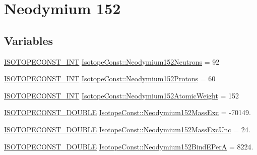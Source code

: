 \hypertarget{group___isotope_const-_neodymium-_nd152}{}\section{Neodymium 152}
\label{group___isotope_const-_neodymium-_nd152}
\subsection*{Variables}
\begin{DoxyCompactItemize}
\item 
\mbox{\hyperlink{group___isotope_const-_macros_ga5f18360b3e99483a35c32d789e62621c}{I\+S\+O\+T\+O\+P\+E\+C\+O\+N\+S\+T\+\_\+\+I\+NT}} \mbox{\hyperlink{group___isotope_const-_neodymium-_nd152_ga5b9b229177b8845abaec4a70f13971ec}{Isotope\+Const\+::\+Neodymium152\+Neutrons}} = 92
\item 
\mbox{\hyperlink{group___isotope_const-_macros_ga5f18360b3e99483a35c32d789e62621c}{I\+S\+O\+T\+O\+P\+E\+C\+O\+N\+S\+T\+\_\+\+I\+NT}} \mbox{\hyperlink{group___isotope_const-_neodymium-_nd152_ga3c7a49ac0a067dd34a0bd091e7fdbc4e}{Isotope\+Const\+::\+Neodymium152\+Protons}} = 60
\item 
\mbox{\hyperlink{group___isotope_const-_macros_ga5f18360b3e99483a35c32d789e62621c}{I\+S\+O\+T\+O\+P\+E\+C\+O\+N\+S\+T\+\_\+\+I\+NT}} \mbox{\hyperlink{group___isotope_const-_neodymium-_nd152_ga7ed50e1ec9d535867cab3b4f333e3b79}{Isotope\+Const\+::\+Neodymium152\+Atomic\+Weight}} = 152
\item 
\mbox{\hyperlink{group___isotope_const-_macros_ga8f45a7272ce02c0b4c65c44636ed719a}{I\+S\+O\+T\+O\+P\+E\+C\+O\+N\+S\+T\+\_\+\+D\+O\+U\+B\+LE}} \mbox{\hyperlink{group___isotope_const-_neodymium-_nd152_ga766db37b0e134c00d2a24d34200237d0}{Isotope\+Const\+::\+Neodymium152\+Mass\+Exc}} = -\/70149.
\item 
\mbox{\hyperlink{group___isotope_const-_macros_ga8f45a7272ce02c0b4c65c44636ed719a}{I\+S\+O\+T\+O\+P\+E\+C\+O\+N\+S\+T\+\_\+\+D\+O\+U\+B\+LE}} \mbox{\hyperlink{group___isotope_const-_neodymium-_nd152_ga42a449ac9b571caf0ba0f3cc6510f994}{Isotope\+Const\+::\+Neodymium152\+Mass\+Exc\+Unc}} = 24.
\item 
\mbox{\hyperlink{group___isotope_const-_macros_ga8f45a7272ce02c0b4c65c44636ed719a}{I\+S\+O\+T\+O\+P\+E\+C\+O\+N\+S\+T\+\_\+\+D\+O\+U\+B\+LE}} \mbox{\hyperlink{group___isotope_const-_neodymium-_nd152_ga10f350b4b4593cec2d738d48bdaf3790}{Isotope\+Const\+::\+Neodymium152\+Bind\+E\+PerA}} = 8224.
\item 

\end{DoxyCompactItemize}
